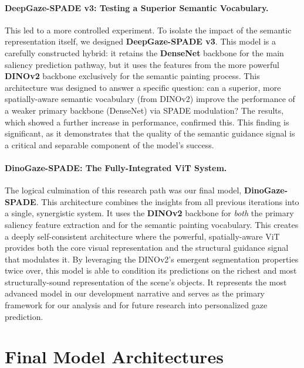 \paragraph{DeepGaze-SPADE v3: Testing a Superior Semantic Vocabulary.}
This led to a more controlled experiment. To isolate the impact of the semantic representation itself, we designed \textbf{DeepGaze-SPADE v3}. This model is a carefully constructed hybrid: it retains the \textbf{DenseNet} backbone for the main saliency prediction pathway, but it uses the features from the more powerful \textbf{DINOv2} backbone exclusively for the semantic painting process. This architecture was designed to answer a specific question: can a superior, more spatially-aware semantic vocabulary (from DINOv2) improve the performance of a weaker primary backbone (DenseNet) via SPADE modulation? The results, which showed a further increase in performance, confirmed this. This finding is significant, as it demonstrates that the quality of the semantic guidance signal is a critical and separable component of the model's success.

\paragraph{DinoGaze-SPADE: The Fully-Integrated ViT System.}
The logical culmination of this research path was our final model, \textbf{DinoGaze-SPADE}. This architecture combines the insights from all previous iterations into a single, synergistic system. It uses the \textbf{DINOv2} backbone for \textit{both} the primary saliency feature extraction and for the semantic painting vocabulary. This creates a deeply self-consistent architecture where the powerful, spatially-aware ViT provides both the core visual representation and the structural guidance signal that modulates it. By leveraging the DINOv2's emergent segmentation properties twice over, this model is able to condition its predictions on the richest and most structurally-sound representation of the scene's objects. It represents the most advanced model in our development narrative and serves as the primary framework for our analysis and for future research into personalized gaze prediction.




\section{Final Model Architectures}
\label{sec:method_final_architectures}

